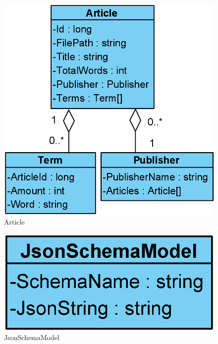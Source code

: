 \begin{figure}[H]
    \centering
    \includegraphics[scale=0.25]{Images/ArticleModel.PNG}
    \caption{Article}
    \label{Article}
\end{figure}


\begin{figure}[H]
    \centering
    \includegraphics[scale=0.25]{Images/JsonSchemaModel.png}
    \caption{JsonSchemaModel}
    \label{JsonSchemaModel}
\end{figure}


